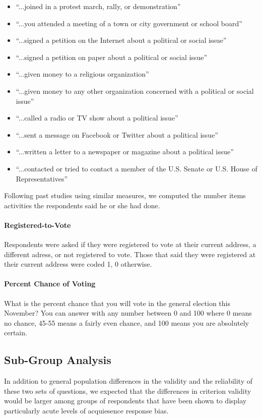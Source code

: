 \documentclass[man,apacite,floatsintext]{apa6}
\begin{document}
\begin{itemize}
\item ``...joined in a protest march, rally, or demonstration''
\item ``...you attended a meeting of a town or city government or school board''
\item ``...signed a petition on the Internet about a political or social issue''
\item ``...signed a petition on paper about a political or social issue''
\item ``...given money to a religious organization''
\item ``...given money to any other organization concerned with a political or social issue''
\item ``...called a radio or TV show about a political issue''
\item ``...sent a message on Facebook or Twitter about a political issue''
\item ``...written a letter to a newspaper or magazine about a political issue''
\item ``...contacted or tried to contact a member of the U.S. Senate or U.S. House of Representatives''
\end{itemize}

Following past studies using similar measures, we computed the number items activities the respondents said he or she had done. 

\paragraph{Registered-to-Vote}
Respondents were asked if they were registered to vote at their current address, a different adress, or not registered to vote. Those that said they were registered at their current address were coded 1, 0 otherwise. 

\paragraph{Percent Chance of Voting}
What is the percent chance that you will vote in the general election this November? You can answer with any number between 0 and 100 where 0 means no chance, 45-55 means a fairly even chance, and 100 means you are absolutely certain.

\subsection{Sub-Group Analysis}
In addition to general population differences in the validity and the reliability of these two sets of questions, we expected that the differences in criterion validity would be larger among groups of respondents that have been shown to display particularly acute levels of acquiesence response bias.
\end{document}

